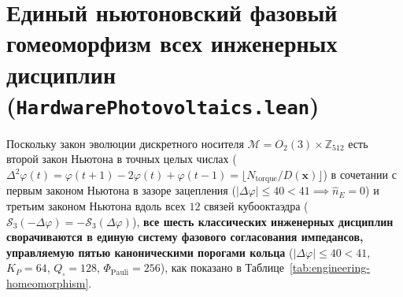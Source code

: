 \documentclass[11pt,a4paper]{article}
\theoremstyle{definition}
\theoremstyle{remark}
\begin{document}
\section{Единый ньютоновский фазовый гомеоморфизм всех инженерных дисциплин (\texttt{HardwarePhotovoltaics.lean})}
\label{sec:unified-engineering-homeomorphism}

Поскольку закон эволюции дискретного носителя $\mathcal{M} = O_2(3)\times\mathbb{Z}_{512}$ есть второй закон Ньютона в точных целых числах ($\Delta^2\varphi(t) = \varphi(t+1)-2\varphi(t)+\varphi(t-1) = \lfloor N_{\mathrm{torque}}/D(\mathbf{x})\rfloor$) в сочетании с первым законом Ньютона в зазоре зацепления ($|\Delta\varphi|\le 40 < 41 \implies \hat{n}_E = 0$) и третьим законом Ньютона вдоль всех $12$ связей кубооктаэдра ($\mathcal{S}_3(-\Delta\varphi) = -\mathcal{S}_3(\Delta\varphi)$), \textbf{все шесть классических инженерных дисциплин сворачиваются в единую систему фазового согласования импедансов, управляемую пятью каноническими порогами кольца} ($|\Delta\varphi|\le 40 < 41$, $K_P = 64$, $Q_\square = 128$, $\Phi_{\mathrm{Pauli}} = 256$), как показано в Таблице~\ref{tab:engineering-homeomorphism}.
\end{document}
